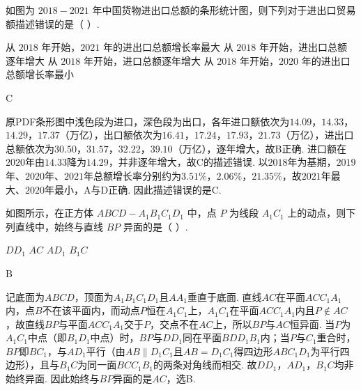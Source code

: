\begin{problem}
如图为 \(2018-2021\) 年中国货物进出口总额的条形统计图，则下列对于进出口贸易额描述错误的是（ \quad ）.


\choices
    {从 \(2018\) 年开始，\(2021\) 年的进出口总额增长率最大}
    {从 \(2018\) 年开始，进出口总额逐年增大}
    {从 \(2018\) 年开始，进口总额逐年增大}
    {从 \(2018\) 年开始，\(2020\) 年的进出口总额增长率最小}
\end{problem}

\begin{answer}
C
\end{answer}

\begin{solution}
原PDF条形图中浅色段为进口，深色段为出口，各年进口额依次为\(14.09\)，\(14.33\)，\(14.29\)，\(17.37\)（万亿），出口额依次为\(16.41\)，\(17.24\)，\(17.93\)，\(21.73\)（万亿），进出口总额依次为\(30.50\)，\(31.57\)，\(32.22\)，\(39.10\)（万亿），逐年增大，故B正确. 进口额在\(2020\)年由\(14.33\)降为\(14.29\)，并非逐年增大，故C的描述错误. 以\(2018\)年为基期，\(2019\)年、\(2020\)年、\(2021\)年总额增长率分别约为\(3.51\%\)，\(2.06\%\)，\(21.35\%\)，故\(2021\)年最大、\(2020\)年最小，A与D正确. 因此描述错误的是C.
\end{solution}

\begin{problem}
如图所示，在正方体 \(ABCD-A_1B_1C_1D_1\) 中，点 \(P\) 为线段 \(A_1C_1\) 上的动点，则下列直线中，始终与直线 \(BP\) 异面的是（ \quad ）.


\choices
    {\(DD_1\)}
    {\(AC\)}
    {\(AD_1\)}
    {\(B_1C\)}
\end{problem}

\begin{answer}
B
\end{answer}

\begin{solution}
记底面为\(ABCD\)，顶面为\(A_1B_1C_1D_1\)且\(AA_1\)垂直于底面. 直线\(AC\)在平面\(ACC_1A_1\)内，点\(B\)不在该平面内，而动点\(P\)恒在\(A_1C_1\)上，\(A_1C_1\)在平面\(ACC_1A_1\)内且\(P\notin AC\)，故直线\(BP\)与平面\(ACC_1A_1\)交于\(P\)，交点不在\(AC\)上，所以\(BP\)与\(AC\)恒异面. 当\(P\)为\(A_1C_1\)中点（即\(B_1D_1\)中点）时，\(BP\)与\(DD_1\)同在平面\(BDD_1B_1\)内；当\(P\)与\(C_1\)重合时，\(BP\)即\(BC_1\)，与\(AD_1\)平行（由\(AB\parallel D_1C_1\)且\(AB=D_1C_1\)得四边形\(ABC_1D_1\)为平行四边形），且与\(B_1C\)为同一面\(BCC_1B_1\)的两条对角线而相交. 故\(DD_1\)，\(AD_1\)，\(B_1C\)均非始终异面. 因此始终与\(BP\)异面的是\(AC\)，选B.
\end{solution}

